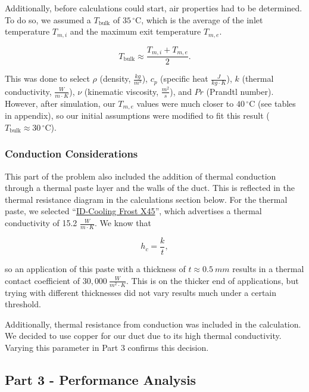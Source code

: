 \documentclass[12pt, titlepage]{article}
\begin{document}
Additionally, before calculations could start, air properties had to be determined. To do so, we assumed a $T_{\text{bulk}}$ of $35\,^\circ\mathrm{C}$, which is the average of the inlet temperature $T_{m,i}$ and the maximum exit temperature $T_{m,e}$.

\begin{equation}
T_{\text{bulk}} \approx \frac{T_{m,i} + T_{m,e}}{2}.
\end{equation}

This was done to select $\rho$ (density, $\tfrac{kg}{m^3}$), $c_p$ (specific heat $\tfrac{J}{kg \cdot K}$), $k$ (thermal conductivity, $\tfrac{W}{m\cdot K}$), $\nu$ (kinematic viscosity, $\tfrac{m^2}{s}$), and $Pr$ (Prandtl number). However, after simulation, our $T_{m,e}$ values were much closer to $40\,^\circ\mathrm{C}$ (see tables in appendix), so our initial assumptions were modified to fit this result ($T_{\text{bulk}} \approx 30\,^\circ\mathrm{C}$).

\subsubsection{Conduction Considerations}

This part of the problem also included the addition of thermal conduction through a thermal paste layer and the walls of the duct. This is reflected in the thermal resistance diagram in the calculations section below. For the thermal paste, we selected ``\href{https://www.tomshardware.com/best-picks/best-thermal-paste}{ID-Cooling Frost X45}'', which advertises a thermal conductivity of 15.2 $\tfrac{W}{m\cdot K}$. We know that 

\begin{equation}
h_c = \frac{k}{t},
\end{equation}

so an application of this paste with a thickness of $t \approx 0.5\ mm$ results in a thermal contact coefficient of $30,000\ \tfrac{W}{m^2\cdot K}$. This is on the thicker end of applications, but trying with different thicknesses did not vary results much under a certain threshold.

Additionally, thermal resistance from conduction was included in the calculation. We decided to use copper for our duct due to its high thermal conductivity. Varying this parameter in Part 3 confirms this decision.

\subsection{Part 3 - Performance Analysis}
\end{document}
